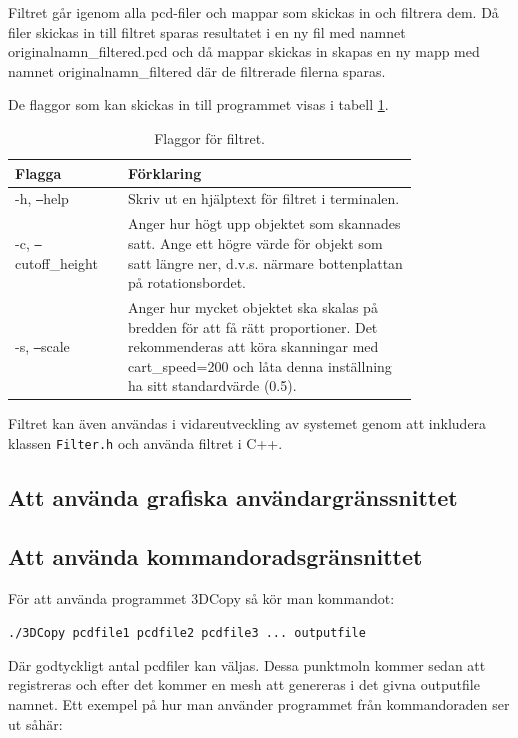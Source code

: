 \documentclass[a4paper,titlepage,12pt]{article}
\begin{document}
	Filtret går igenom alla pcd-filer och mappar som skickas in och filtrera dem. Då filer skickas in till filtret sparas resultatet i en ny fil med namnet originalnamn\_filtered.pcd och då mappar skickas in skapas en ny mapp med namnet originalnamn\_filtered där de filtrerade filerna sparas.
	
	De flaggor som kan skickas in till programmet visas i tabell \ref{tab:filter_flaggor}.
	
	\begin{table}[h!]
		\centering
		\caption{Flaggor för filtret.}
		\label{tab:filter_flaggor}
		
		\begin{tabular}{p{0.2\linewidth}p{0.6\linewidth}}
			Flagga & Förklaring \\
			\hline
			-h, \texttt{--}help & Skriv ut en hjälptext för filtret i terminalen. \\
			\hline
			-c, \texttt{--}cutoff\_height & Anger hur högt upp objektet som skannades satt. Ange ett högre värde för objekt som satt längre ner, d.v.s. närmare bottenplattan på rotationsbordet. \\
			\hline
			-s, \texttt{--}scale & Anger hur mycket objektet ska skalas på bredden för att få rätt proportioner. Det rekommenderas att köra skanningar med cart\_speed=200 och låta denna inställning ha sitt standardvärde (0.5). \\
			\hline
		\end{tabular}
	
	\end{table}

	Filtret kan även användas i vidareutveckling av systemet genom att inkludera klassen \texttt{Filter.h} och använda filtret i C++.
	
	\subsection{Att använda grafiska användargränssnittet}
	
	\subsection{Att använda kommandoradsgränsnittet}
		För att använda programmet 3DCopy så kör man kommandot:
		
		\texttt{./3DCopy pcdfile1 pcdfile2 pcdfile3 ... outputfile}
		
		Där godtyckligt antal pcdfiler kan väljas. Dessa punktmoln kommer sedan att registreras och efter det kommer en mesh att genereras i det givna outputfile namnet. Ett exempel på hur man använder programmet från kommandoraden ser ut såhär:
		
\end{document}

